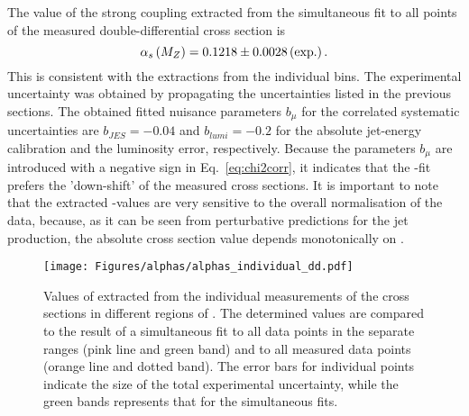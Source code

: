 The value of the strong coupling extracted from the simultaneous fit to all points of the measured double-differential cross section is
\begin{equation}
 \asz = 0.1218 \pm 0.0028 \left( \text{exp.} \right). %
 \label{eq:asdoubledifval}
\end{equation}
This is consistent with the extractions from the individual \qsq bins. The experimental uncertainty was obtained by propagating the uncertainties listed in the previous sections. The obtained fitted nuisance parameters $b_{\mu}$ for the correlated systematic uncertainties are $b_{JES}=-0.04$ and $b_{lumi}=-0.2$ for the absolute jet-energy calibration and the luminosity error, respectively. Because the parameters $b_{\mu}$ are introduced with a negative sign in Eq.~\eqref{eq:chi2corr}, it indicates that the \as-fit prefers the 'down-shift' of the measured cross sections. It is important to note that the extracted \as-values are very sensitive to the overall normalisation of the data, because, as it can be seen from perturbative predictions for the jet production, the absolute cross section value depends monotonically on \asz.

\begin{figure}[p]
 \centering
 \texttt{[image: Figures/alphas/alphas\_individual\_dd.pdf]}
 \caption{Values of \asz extracted from the individual measurements of the \dsdetjetb cross sections in different regions of \qsq. The determined values are compared to the result of a simultaneous fit to all data points in the separate \qsq ranges (pink line and green band) and to all measured data points (orange line and dotted band). The error bars for individual points indicate the size of the total experimental uncertainty, while the green bands represents that for the simultaneous fits.}
 \label{fig:asindividual_dd}
\end{figure}

% 
